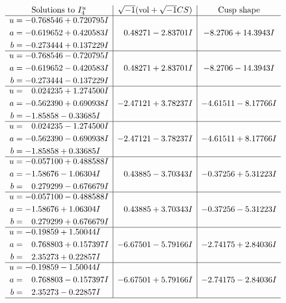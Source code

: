 \documentclass[1p]{elsarticle_modified}
\theoremstyle{definition}
\newcommand{\I}{\sqrt{-1}}
\begin{document}
$$\begin{array}{c|c|c}  
\text{Solutions to }I^u_{4}& \I (\text{vol} + \sqrt{-1}CS) & \text{Cusp shape}\\
 \hline 
\begin{aligned}
u &= -0.768546 + 0.720795 I \\
a &= -0.619652 + 0.420583 I \\
b &= -0.273444 + 0.137229 I\end{aligned}
 & \phantom{-}0.48271 - 2.83701 I & -8.2706 + 14.3943 I \\ \hline\begin{aligned}
u &= -0.768546 - 0.720795 I \\
a &= -0.619652 - 0.420583 I \\
b &= -0.273444 - 0.137229 I\end{aligned}
 & \phantom{-}0.48271 + 2.83701 I & -8.2706 - 14.3943 I \\ \hline\begin{aligned}
u &= \phantom{-}0.024235 + 1.274500 I \\
a &= -0.562390 + 0.690938 I \\
b &= -1.85858 - 0.33685 I\end{aligned}
 & -2.47121 + 3.78237 I & -4.61511 - 8.17766 I \\ \hline\begin{aligned}
u &= \phantom{-}0.024235 - 1.274500 I \\
a &= -0.562390 - 0.690938 I \\
b &= -1.85858 + 0.33685 I\end{aligned}
 & -2.47121 - 3.78237 I & -4.61511 + 8.17766 I \\ \hline\begin{aligned}
u &= -0.057100 + 0.488588 I \\
a &= -1.58676 - 1.06304 I \\
b &= \phantom{-}0.279299 - 0.676679 I\end{aligned}
 & \phantom{-}0.43885 - 3.70343 I & -0.37256 + 5.31223 I \\ \hline\begin{aligned}
u &= -0.057100 - 0.488588 I \\
a &= -1.58676 + 1.06304 I \\
b &= \phantom{-}0.279299 + 0.676679 I\end{aligned}
 & \phantom{-}0.43885 + 3.70343 I & -0.37256 - 5.31223 I \\ \hline\begin{aligned}
u &= -0.19859 + 1.50044 I \\
a &= \phantom{-}0.768803 + 0.157397 I \\
b &= \phantom{-}2.35273 + 0.22857 I\end{aligned}
 & -6.67501 - 5.79166 I & -2.74175 + 2.84036 I \\ \hline\begin{aligned}
u &= -0.19859 - 1.50044 I \\
a &= \phantom{-}0.768803 - 0.157397 I \\
b &= \phantom{-}2.35273 - 0.22857 I\end{aligned}
 & -6.67501 + 5.79166 I & -2.74175 - 2.84036 I\\
 \hline 
 \end{array}$$\newpage
\end{document}
